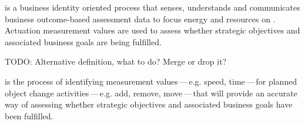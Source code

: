 \textbf{} is a business identity oriented
process that senses, understands and communicates business outcome-based assessment data to focus energy and
resources on .
Actuation measurement values are used to assess whether strategic objectives and associated
business goals are being fulfilled.

TODO: Alternative definition, what to do? Merge or drop it?

\textbf{} is the process of identifying measurement values\,---\,e.g.
speed, time\,---\,for planned object change activities\,---\,e.g. add, remove, move\,---\,that will provide an
accurate way of assessing whether strategic objectives and associated business goals have
been fulfilled.